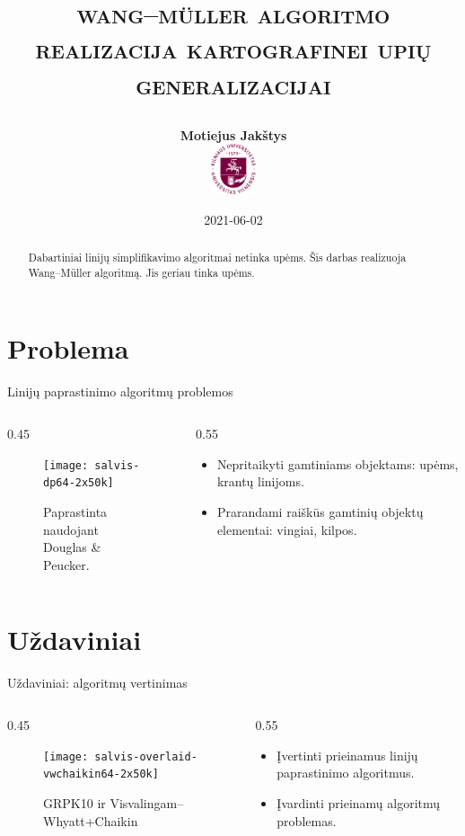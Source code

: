 \documentclass[14pt]{beamer}
\title{
    \Large\textsc{wang–müller algoritmo realizacija 
    kartografinei upių generalizacijai}

}
\author{\small \bf Motiejus Jakštys \\[4ex]
    \includegraphics[height=4em]{vu}
}
\date{\small 2021-06-02}
\newcommand{\DP}{Douglas \& Peucker}
\newcommand{\VW}{Visvalingam--Whyatt}
\newcommand{\WM}{Wang--M{\"u}ller}
\newcommand{\twocols}[2]
{
    \begin{columns}[c]
        \begin{column}{0.45\textwidth}
            #1
        \end{column}
        \begin{column}{0.55\textwidth}
            #2
        \end{column}
    \end{columns}
}
\begin{document}

\begin{frame}
\titlepage
\end{frame}

\begin{frame}
  \begin{abstract}

    Dabartiniai linijų simplifikavimo algoritmai netinka upėms. Šis darbas
    realizuoja {\WM} algoritmą. Jis geriau tinka upėms.

  \end{abstract}
\end{frame}

\section{Problema}

\begin{frame}{Linijų paprastinimo algoritmų problemos}
  \twocols{
    \begin{figure}[ht]
      \texttt{[image: salvis-dp64-2x50k]}
      \caption{\footnotesize Paprastinta naudojant \\ {\DP}.}
    \end{figure}
  }{
    \begin{itemize}
      \item Nepritaikyti gamtiniams objektams: upėms, krantų linijoms.
      \item Prarandami raiškūs gamtinių objektų elementai: vingiai, kilpos.
    \end{itemize}
  }
\end{frame}

\section{Uždaviniai}

\begin{frame}{Uždaviniai: algoritmų vertinimas}
  \twocols{
    \begin{figure}[ht]
      \texttt{[image: salvis-overlaid-vwchaikin64-2x50k]}
      \caption{\footnotesize GRPK10 ir {\VW}+Chaikin}
    \end{figure}
  }{
    \begin{itemize}
      \item Įvertinti prieinamus linijų paprastinimo algoritmus.
      \item Įvardinti prieinamų algoritmų problemas.
    \end{itemize}
  }
\end{frame}
\end{document}
